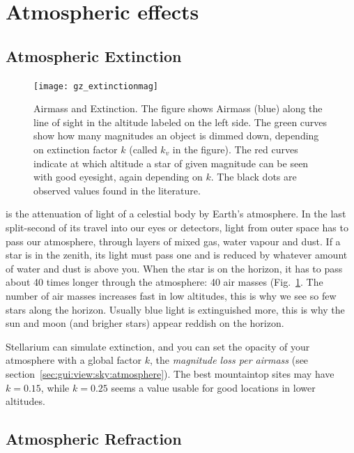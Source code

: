 \section{Atmospheric effects}
\label{sec:phenomena:Atmosphere}

\subsection{Atmospheric Extinction}
\label{sec:phenomena:Extinction}

\begin{figure}[tb]
\centering\texttt{[image: gz\_extinctionmag]}
\caption{Airmass and Extinction.  The figure shows Airmass (blue)
  along the line of sight in the altitude labeled on the left side.
  The green curves show how many magnitudes an object is dimmed down,
  depending on extinction factor $k$ (called $k_v$ in the figure). The
  red curves indicate at which altitude a star of given magnitude can
  be seen with good eyesight, again depending on $k$. The black dots
  are observed values found in the literature.}
\label{fig:Extinction}
\end{figure}

 is the attenuation of light of a
celestial body by Earth's atmosphere. In the last split-second of its
travel into our eyes or detectors, light from outer space has to pass
our atmosphere, through layers of mixed gas, water vapour and dust. If
a star is in the zenith, its light must pass one 
and is reduced by whatever amount of water and dust is above you. When
the star is on the horizon, it has to pass about 40 times longer
through the atmosphere: 40 air masses (Fig.~\ref{fig:Extinction}. The
number of air masses increases fast in low altitudes, this is why we
see so few stars along the horizon. Usually blue light is extinguished
more, this is why the sun and moon (and brigher stars) appear reddish
on the horizon.

Stellarium can simulate extinction, and you can set the opacity of
your atmosphere with a global factor $k$, the \emph{magnitude loss per
  airmass} (see section~\ref{sec:gui:view:sky:atmosphere}). The best
mountaintop sites may have $k=0.15$, while $k=0.25$ seems a value
usable for good locations in lower altitudes.

\subsection{Atmospheric Refraction}
\label{sec:phenomena:Refraction}


